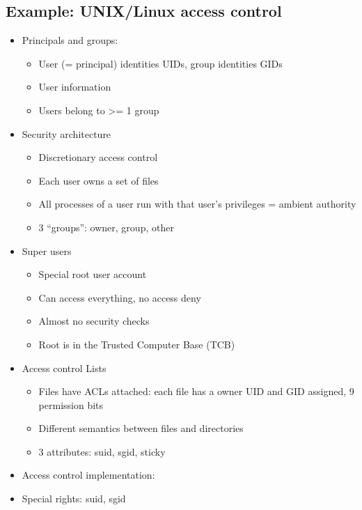 \documentclass{article}
\newenvironment{myitemize}
{ \begin{itemize}
    \setlength{\itemsep}{005pt}
    \setlength{\parskip}{0pt}
    \setlength{\parsep}{0pt}     }
{ \end{itemize}                  }
\begin{document}
\begin{multicols}{2}
\subsection{Example: UNIX/Linux access control}

\begin{myitemize}
    \item Principals and groups:
    \begin{myitemize}
        \item User (= principal) identities UIDs, group identities GIDs
        \item User information
        \item Users belong to >= 1 group
    \end{myitemize}

    \item Security architecture
    \begin{myitemize}
        \item Discretionary access control
        \item Each user owns a set of files 
        \item All processes of a user run with that user’s privileges = ambient authority
        \item 3 “groups”: owner, group, other
    \end{myitemize}

    \item Super users
    \begin{myitemize}
        \item Special root user account
        \item Can access everything, no access deny
        \item Almost no security checks
        \item Root is in the Trusted Computer Base (TCB)
    \end{myitemize}

    \item Access control Lists
    \begin{myitemize}
        \item Files have ACLs attached: each file has a owner UID and GID assigned, 9 permission bits
        \item Different semantics between files and directories
        \item 3 attributes: suid, sgid, sticky
    \end{myitemize}

    \item Access control implementation:
    \item Special rights: suid, sgid
\end{myitemize}


\end{multicols}
\end{document}
